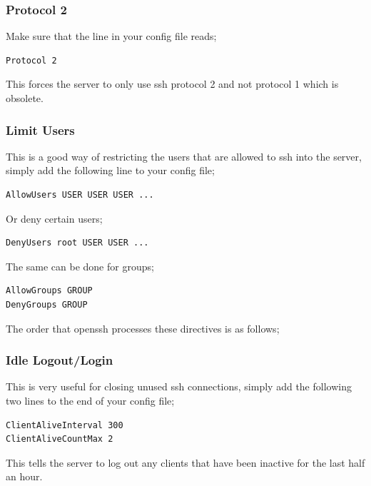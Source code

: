 \subsubsection{Protocol 2}

Make sure that the line in your config file reads;

\begin{verbatim}
Protocol 2
\end{verbatim}

This forces the server to only use ssh protocol 2 and not protocol 1 which is obsolete.

\subsubsection{Limit Users}

This is a good way of restricting the users that are allowed to ssh into the server, simply add the following line to your config file;

\begin{verbatim}
AllowUsers USER USER USER ...
\end{verbatim}

Or deny certain users;

\begin{verbatim}
DenyUsers root USER USER ...
\end{verbatim}

The same can be done for groups;

\begin{verbatim}
AllowGroups GROUP
DenyGroups GROUP
\end{verbatim}

The order that openssh processes these directives is as follows;


\subsubsection{Idle Logout/Login}

This is very useful for closing unused ssh connections, simply add the following two lines to the end of your config file;\

\begin{verbatim}
ClientAliveInterval 300
ClientAliveCountMax 2
\end{verbatim}

This tells the server to log out any clients that have been inactive for the last half an hour.


